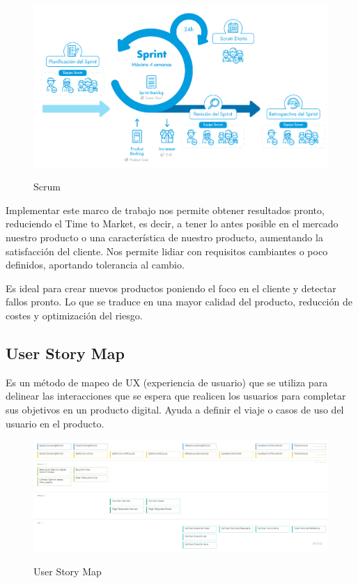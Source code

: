 \documentclass[12pt,twoside,titlepage]{report}
\begin{document}
\begin{figure}[H]
    \centering
    \includegraphics[scale=0.39]{Scrum/Scrum}
    \label{fig:Scrum}
    \caption{Scrum}
\end{figure}

Implementar este marco de trabajo nos permite obtener resultados pronto, reduciendo el Time to Market, es decir, a tener lo antes posible en el mercado nuestro producto o una característica de nuestro producto, aumentando la satisfacción del cliente. Nos permite lidiar con requisitos cambiantes o poco definidos, aportando tolerancia al cambio.

Es ideal para crear nuevos productos poniendo el foco en el cliente y detectar fallos pronto. Lo que se traduce en una mayor calidad del producto, reducción de costes y optimización del riesgo.

\subsection{User Story Map}

Es un método de mapeo de UX (experiencia de usuario) que se utiliza para delinear las interacciones que se espera que realicen los usuarios para completar sus objetivos en un producto digital. Ayuda a definir el viaje o casos de uso del usuario en el producto.

\begin{figure}[H]
    \centering
    \includegraphics[scale=0.25]{Scrum/UserStoryMap}
    \label{fig:UserStoryMap}
    \caption{User Story Map}
\end{figure}
\end{document}
